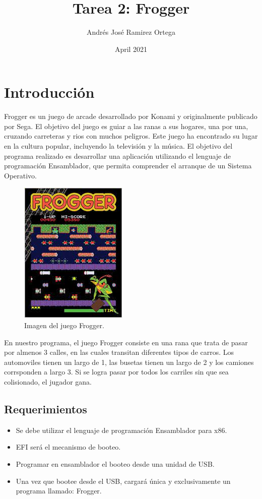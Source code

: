\documentclass{article}
\title{Tarea 2: Frogger}
\author{Andrés José Ramirez Ortega}
\date{April 2021}
\begin{document}
\maketitle

\section{Introducción}
Frogger es un juego de arcade desarrollado por Konami y originalmente publicado por Sega. El objetivo del juego es guiar a las ranas a sus hogares, una por una, cruzando carreteras y rios con muchos peligros. Este juego ha encontrado su lugar en la cultura popular, incluyendo la televisión y la música. El objetivo del programa realizado es desarrollar una aplicación utilizando el lenguaje de programación Ensamblador, que permita comprender el arranque de un Sistema Operativo.

\begin{figure}[h!]
\centering
\includegraphics[scale=0.5]{frogeers.jpg}
\caption{Imagen del juego Frogger.}
\label{fig:frogeers}
\end{figure}

En nuestro programa, el juego Frogger consiste en una rana que trata de pasar por almenos 3 calles, en las cuales transitan diferentes tipos de carros. Los automoviles tienen un largo de 1, las busetas tienen un largo de 2 y los camiones corrsponden a largo 3. Si se logra pasar por todos los carriles sin que sea colisionado, el jugador gana. 

\subsection{Requerimientos}
\begin{itemize}
    \item Se debe utilizar el lenguaje de programación Ensamblador para x86.
    \item EFI será el mecanismo de booteo.
    \item Programar en ensamblador el booteo desde una unidad de USB.
    \item Una vez que bootee desde el USB, cargará única y exclusivamente un programa llamado: Frogger. 
\end{itemize}
\end{document}
